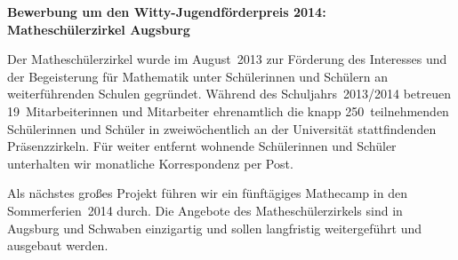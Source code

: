 \documentclass[12pt]{zettel}
\begin{document}
\pagestyle{plain}

\renewcommand{\betreff}{}

\makeletterhead{}

\vspace{-2em}

\begin{center}
  \Large\textbf{\textsf{Bewerbung um den Witty-Jugendförderpreis 2014: \\
  Matheschülerzirkel Augsburg}}
\end{center}




Der Matheschülerzirkel wurde im August~2013 zur Förderung des
Interesses und der Begeisterung für Mathematik unter Schülerinnen und Schülern
an weiterführenden Schulen gegründet. Während des Schuljahrs~2013/2014 betreuen
19~Mitarbeiterinnen und Mitarbeiter ehrenamtlich die knapp
250~teilnehmenden Schülerinnen und Schüler in zweiwöchentlich an der
Universität stattfindenden Präsenzzirkeln. Für weiter entfernt wohnende Schülerinnen
und Schüler unterhalten wir monatliche Korrespondenz per Post.

Als nächstes großes Projekt führen wir ein fünftägiges Mathecamp in den
Sommerferien~2014 durch. Die Angebote des Matheschülerzirkels sind in Augsburg
und Schwaben einzigartig und sollen langfristig weitergeführt und ausgebaut
werden.
\end{document}
